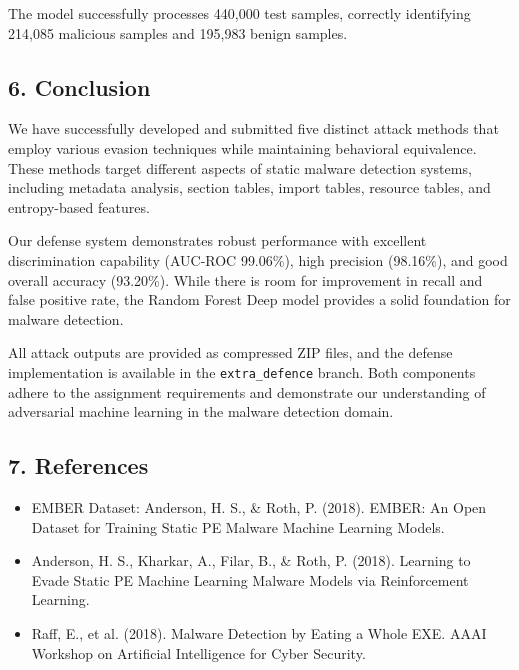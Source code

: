 \documentclass[12pt,letterpaper]{article}
\begin{document}
The model successfully processes 440,000 test samples, correctly identifying 214,085 malicious samples and 195,983 benign samples.

\subsection*{6. Conclusion}

We have successfully developed and submitted five distinct attack methods that employ various evasion techniques while maintaining behavioral equivalence. These methods target different aspects of static malware detection systems, including metadata analysis, section tables, import tables, resource tables, and entropy-based features.

Our defense system demonstrates robust performance with excellent discrimination capability (AUC-ROC 99.06\%), high precision (98.16\%), and good overall accuracy (93.20\%). While there is room for improvement in recall and false positive rate, the Random Forest Deep model provides a solid foundation for malware detection.

All attack outputs are provided as compressed ZIP files, and the defense implementation is available in the \texttt{extra\_defence} branch. Both components adhere to the assignment requirements and demonstrate our understanding of adversarial machine learning in the malware detection domain.

\subsection*{7. References}

\begin{itemize}
    \item EMBER Dataset: Anderson, H. S., \& Roth, P. (2018). EMBER: An Open Dataset for Training Static PE Malware Machine Learning Models.
    \item Anderson, H. S., Kharkar, A., Filar, B., \& Roth, P. (2018). Learning to Evade Static PE Machine Learning Malware Models via Reinforcement Learning.
    \item Raff, E., et al. (2018). Malware Detection by Eating a Whole EXE. AAAI Workshop on Artificial Intelligence for Cyber Security.
\end{itemize}
\end{document}
